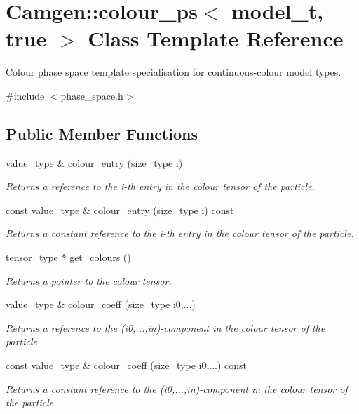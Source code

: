 \hypertarget{a00086}{}\section{Camgen\+:\+:colour\+\_\+ps$<$ model\+\_\+t, true $>$ Class Template Reference}
\label{a00086}


Colour phase space template specialisation for continuous-\/colour model types.  




{\ttfamily \#include $<$phase\+\_\+space.\+h$>$}

\subsection*{Public Member Functions}
\begin{DoxyCompactItemize}
\item 
value\+\_\+type \& \hyperlink{a00086_afd04e91a928a45bbbadb962002930ff9}{colour\+\_\+entry} (size\+\_\+type i)
\begin{DoxyCompactList}\small\item\em Returns a reference to the i-\/th entry in the colour tensor of the particle. \end{DoxyCompactList}\item 
const value\+\_\+type \& \hyperlink{a00086_a5685651ee32f219b20b0972f5c232e61}{colour\+\_\+entry} (size\+\_\+type i) const 
\begin{DoxyCompactList}\small\item\em Returns a constant reference to the i-\/th entry in the colour tensor of the particle. \end{DoxyCompactList}\item 
\hypertarget{a00086_af4e1d64a5c3829b272ba5ed04915a7ac}{}\hyperlink{a00541}{tensor\+\_\+type} $\ast$ \hyperlink{a00086_af4e1d64a5c3829b272ba5ed04915a7ac}{get\+\_\+colours} ()\label{a00086_af4e1d64a5c3829b272ba5ed04915a7ac}

\begin{DoxyCompactList}\small\item\em Returns a pointer to the colour tensor. \end{DoxyCompactList}\item 
value\+\_\+type \& \hyperlink{a00086_ab9cf57138337e10b4c1fb71754e0ead2}{colour\+\_\+coeff} (size\+\_\+type i0,...)
\begin{DoxyCompactList}\small\item\em Returns a reference to the (i0,...,in)-\/component in the colour tensor of the particle. \end{DoxyCompactList}\item 
const value\+\_\+type \& \hyperlink{a00086_aedfdfdeabd064fbb05a815f0906607c0}{colour\+\_\+coeff} (size\+\_\+type i0,...) const 
\begin{DoxyCompactList}\small\item\em Returns a constant reference to the (i0,...,in)-\/component in the colour tensor of the particle. \end{DoxyCompactList}\end{DoxyCompactItemize}



